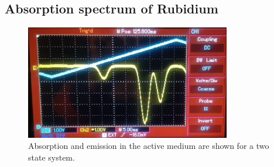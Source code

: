 \subsection{Absorption spectrum of Rubidium}
\begin{figure}[ht]
    \center
    \includegraphics[width=0.8\textwidth]{bilder/spectrum.jpg}
    \caption{Absorption and emission in the active medium are shown for a two state system. \cite{anleitungHeNe}}
    \label{fig:spectrum}
\end{figure}